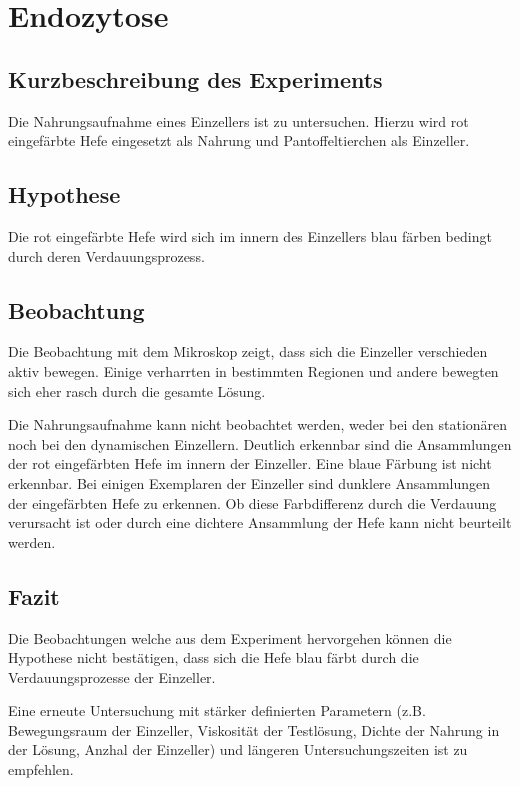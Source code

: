 \section{Endozytose}

\subsection{Kurzbeschreibung des Experiments}
Die Nahrungsaufnahme eines Einzellers ist zu untersuchen.
Hierzu wird rot eingefärbte Hefe eingesetzt als Nahrung und Pantoffeltierchen
als Einzeller.

\subsection{Hypothese}
Die rot eingefärbte Hefe wird sich im innern des Einzellers blau färben
bedingt durch deren Verdauungsprozess.

\subsection{Beobachtung}
Die Beobachtung mit dem Mikroskop zeigt, dass sich die Einzeller verschieden
aktiv bewegen. Einige verharrten in bestimmten Regionen und andere bewegten
sich eher rasch durch die gesamte Lösung. 

Die Nahrungsaufnahme kann nicht beobachtet werden, weder bei den stationären
noch bei den dynamischen Einzellern. Deutlich erkennbar sind die Ansammlungen
der rot eingefärbten Hefe im innern der Einzeller. Eine blaue Färbung ist nicht
erkennbar. Bei einigen Exemplaren der Einzeller sind dunklere Ansammlungen
der eingefärbten Hefe zu erkennen. Ob diese Farbdifferenz durch die Verdauung
verursacht ist oder durch eine dichtere Ansammlung der Hefe kann nicht
beurteilt werden.

\subsection{Fazit}
Die Beobachtungen welche aus dem Experiment hervorgehen können die Hypothese
nicht bestätigen, dass sich die Hefe blau färbt durch die Verdauungsprozesse
der Einzeller.

Eine erneute Untersuchung mit stärker definierten Parametern
(z.B. Bewegungsraum der Einzeller, Viskosität der Testlösung,
Dichte der Nahrung in der Lösung, Anzhal der Einzeller) und längeren
Untersuchungszeiten ist zu empfehlen.
